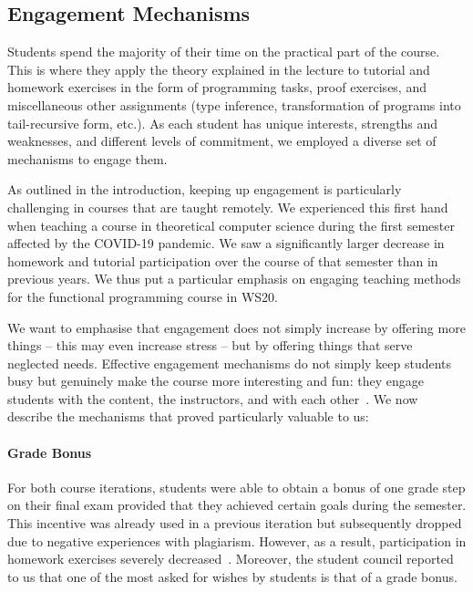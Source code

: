 \subsection{Engagement Mechanisms}\label{sec:engagement}

Students spend the majority of their time on the practical part of the course.
This is where they apply the theory explained in the lecture to tutorial and homework exercises in the form of programming tasks, proof exercises, and miscellaneous other assignments (type inference, transformation of programs into tail-recursive form, etc.).
As each student has unique interests, strengths and weaknesses, and different levels of commitment,
we employed a diverse set of mechanisms to engage them.

As outlined in the introduction, keeping up engagement is particularly challenging in courses that are taught remotely.
We experienced this first hand when teaching a course in theoretical computer science during the first semester affected by the COVID-19 pandemic.
We saw a significantly larger decrease in homework and tutorial participation over the course of that semester than in previous years.
We thus put a particular emphasis on engaging teaching methods for the functional programming course in WS20.

We want to emphasise that engagement does not simply
increase by offering more things -- this may even increase stress --
but by offering things that serve neglected needs.
Effective engagement mechanisms do not simply keep students busy
but genuinely make the course more interesting and fun:
they engage students with the content,
the instructors,
and with each other~\cite{onlineengagement3,onlineengagement2,engagementproposals}.
We now describe the mechanisms that proved particularly valuable to us:

\paragraph{Grade Bonus}
For both course iterations,
students were able to obtain a bonus of one grade step on their final exam provided that they achieved certain goals during the semester.
This incentive was already used in a previous iteration
but subsequently dropped due to negative experiences with plagiarism.
However, as a result, participation in homework exercises
severely decreased~\cite{next_1100}.
Moreover, the student council reported to us that one of the most asked for
wishes by students is that of a grade bonus.

